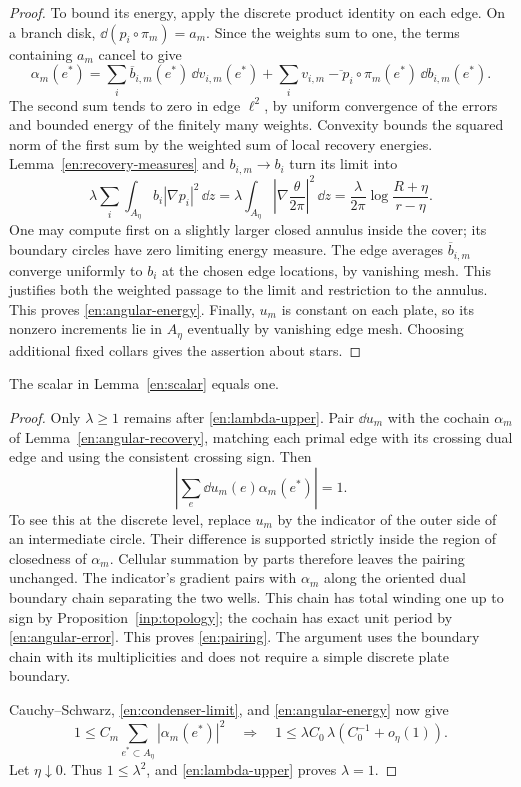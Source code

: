 \begin{proof}
To bound its energy, apply the discrete product identity on each edge.
On a branch disk, $\dd(p_i\circ\pi_m)=a_m$.  Since the weights sum to
one, the terms containing $a_m$ cancel to give
\[
 \alpha_m(e^*)=
 \sum_i\overline b_{i,m}(e^*)\,\dd v_{i,m}(e^*)
 +\sum_i
 \overline{v_{i,m}-p_i\circ\pi_m}(e^*)\,\dd b_{i,m}(e^*).
\]
The second sum tends to zero in edge $\ell^2$, by uniform convergence
of the errors and bounded energy of the finitely many weights.
Convexity bounds the squared norm of the first sum by the weighted sum
of local recovery energies.  Lemma~\ref{en:recovery-measures} and
$b_{i,m}\to b_i$ turn its limit into
\[
 \lambda\sum_i\int_{A_\eta} b_i|\nabla p_i|^2\,\dd z
 =\lambda\int_{A_\eta}\left|\nabla\frac{\theta}{2\pi}\right|^2\,\dd z
 =\frac{\lambda}{2\pi}\log\frac{R+\eta}{r-\eta}.
\]
One may compute first on a slightly larger closed annulus inside the
cover; its boundary circles have zero limiting energy measure.
The edge averages $\overline b_{i,m}$ converge uniformly to $b_i$ at
the chosen edge locations, by vanishing mesh.  This justifies both
the weighted passage to the limit and restriction to the annulus.
This proves \eqref{en:angular-energy}.  Finally, $u_m$ is constant on
each plate, so its nonzero increments lie in $A_\eta$ eventually by
vanishing edge mesh.  Choosing additional fixed collars gives the
assertion about stars.
\end{proof}

\begin{proposition}\label{en:reciprocity}
The scalar in Lemma~\ref{en:scalar} equals one.
\end{proposition}

\begin{proof}
Only $\lambda\ge1$ remains after \eqref{en:lambda-upper}.
Pair $\dd u_m$ with the cochain $\alpha_m$ of
Lemma~\ref{en:angular-recovery}, matching each primal edge with its
crossing dual edge and using the consistent crossing sign.  Then
\begin{equation}\label{en:pairing}
                         \left|\sum_e\dd u_m(e)\alpha_m(e^*)\right|=1.
\end{equation}
To see this at the discrete level, replace $u_m$ by the indicator of the
outer side of an intermediate circle.  Their difference is supported
strictly inside the region of closedness of $\alpha_m$.  Cellular
summation by parts therefore leaves the pairing unchanged.  The
indicator's gradient pairs with $\alpha_m$ along the oriented dual
boundary chain separating the two wells.  This chain has total winding
one up to sign by Proposition~\ref{inp:topology}; the cochain has exact
unit period by \eqref{en:angular-error}.  This proves
\eqref{en:pairing}.  The argument uses the boundary chain with its
multiplicities and does not require a simple discrete plate boundary.

Cauchy--Schwarz, \eqref{en:condenser-limit}, and
\eqref{en:angular-energy} now give
\[
 1\le C_m\sum_{e^*\subset A_\eta}|\alpha_m(e^*)|^2
 \quad\Longrightarrow\quad
 1\le\lambda C_0\,\lambda\left(C_0^{-1}+o_\eta(1)\right).
\]
Let $\eta\downarrow0$.  Thus $1\le\lambda^2$, and
\eqref{en:lambda-upper} proves $\lambda=1$.
\end{proof}

